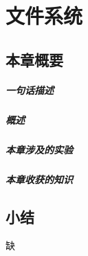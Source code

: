 \chapter{文件系统}\label{ch_filesystem}

\section{本章概要}

\paragraph{一句话描述}

\paragraph{概述}

\paragraph{本章涉及的实验}

\paragraph{本章收获的知识}

%
%
%
%
%
%
%


\section{小结}
缺
